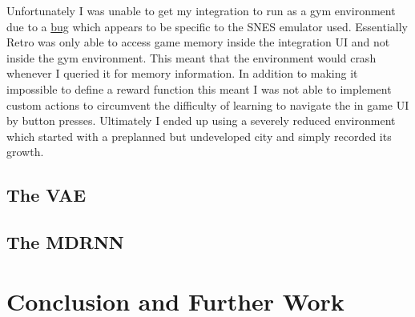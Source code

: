 \documentclass{article}
\numberwithin{figure}{section}
\theoremstyle{definition}
\begin{document}
Unfortunately I was unable to get my integration to run as a gym environment due to a \href{https://github.com/openai/retro/issues/115}{bug} which appears to be specific to the SNES emulator used.
Essentially Retro was only able to access game memory inside the integration UI and not inside the gym environment.
This meant that the environment would crash whenever I queried it for memory information.
In addition to making it impossible to define a reward function this meant I was not able to implement custom actions to circumvent the difficulty of learning to navigate the in game UI by button presses.
Ultimately I ended up using a severely reduced environment which started with a preplanned but undeveloped city and simply recorded its growth.



\subsection{The VAE}
\label{VAEsubsec}

\subsection{The MDRNN}
\label{MDRNNsubsec}



\section{Conclusion and Further Work}

% 
\end{document}
